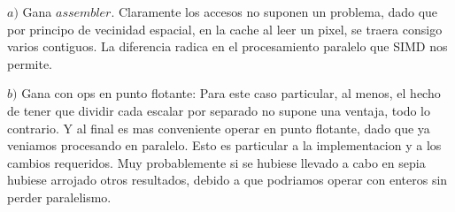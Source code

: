 $a)$ Gana $assembler$. Claramente los accesos no suponen un problema, dado que por principo de vecinidad espacial, en la cache al leer un pixel, se traera consigo varios contiguos. La diferencia radica en el procesamiento paralelo que SIMD nos permite.

$b)$ Gana con ops en punto flotante: Para este caso particular, al menos, el hecho de tener que dividir cada escalar por separado no supone una ventaja, todo lo contrario. Y al final es mas conveniente operar en punto flotante, dado que ya veniamos procesando en paralelo. Esto es particular a la implementacion y a los cambios requeridos. Muy probablemente si se hubiese llevado a cabo en sepia hubiese arrojado otros resultados, debido a que podriamos operar con enteros sin perder paralelismo.
